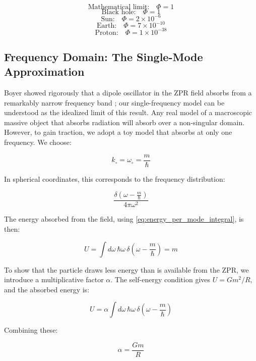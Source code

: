 \documentclass {article}
\begin{document}
$$\text{Mathematical limit:} \quad \Phi = 1$$
$$\text{Black hole:} \quad \Phi = 1$$
$$\text{Sun:} \quad \Phi = 2 \times 10^{-6}$$
$$\text{Earth:} \quad \Phi = 7 \times 10^{-10}$$
$$\text{Proton:} \quad \Phi = 1 \times 10^{-38}$$


\subsection{Frequency Domain: The Single-Mode Approximation}

Boyer showed rigorously that a dipole oscillator in the ZPR field absorbs from a remarkably narrow frequency band \cite{boyer1975}; our single-frequency model can be understood as the idealized limit of this result. Any real model of a macroscopic massive object that absorbs radiation will absorb over a non-singular domain. However, to gain traction, we adopt a toy model that absorbs at only one frequency. We choose:

\begin{equation}
k_{\circ} = \omega_{\circ} = \frac{m}{\hbar}
\end{equation}

In spherical coordinates, this corresponds to the frequency distribution:

\begin{equation}
\frac{\delta\left(\omega - \frac{m}{\hbar}\right)}{4\pi\omega^2}
\end{equation}

The energy absorbed from the field, using \eqref{eq:energy_per_mode_integral}, is then:

\begin{equation}
U = \int d\omega \, \hbar\omega \, \delta\left(\omega - \frac{m}{\hbar}\right) = m
\end{equation}


To show that the particle draws less energy than is available from the ZPR, we introduce a multiplicative factor $\alpha$. The self-energy condition gives $U = Gm^2/R$, and the absorbed energy is:

\begin{equation}
U = \alpha \int d\omega \, \hbar\omega \, \delta\left(\omega - \frac{m}{\hbar}\right)
\end{equation}

Combining these:

\begin{equation}
\alpha = \frac{Gm}{R}
\end{equation}
\end{document}
